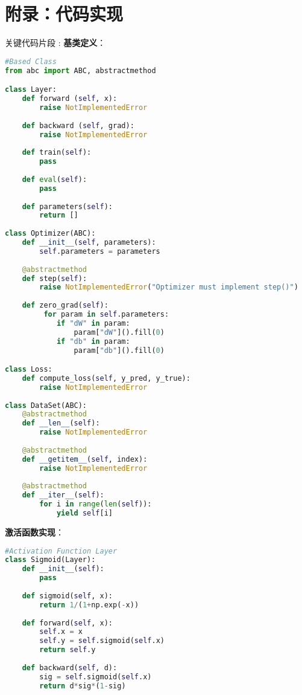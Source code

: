 \documentclass[a4paper, twocolumn]{article}
\begin{document}
\section*{附录：代码实现}
关键代码片段 :
\noindent \textbf{基类定义}：
\begin{lstlisting}[language=Python]
#Based Class
from abc import ABC, abstractmethod

class Layer:
    def forward (self, x):
        raise NotImplementedError
    
    def backward (self, grad):
        raise NotImplementedError
    
    def train(self):
        pass
    
    def eval(self):
        pass
    
    def parameters(self):
        return []
            
class Optimizer(ABC):
    def __init__(self, parameters):
        self.parameters = parameters
    
    @abstractmethod
    def step(self):
        raise NotImplementedError("Optimizer must implement step()")
    
    def zero_grad(self):
         for param in self.parameters:
            if "dW" in param:
                param["dW"]().fill(0)
            if "db" in param:
                param["db"]().fill(0)

class Loss:
    def compute_loss(self, y_pred, y_true): 
        raise NotImplementedError
    
class DataSet(ABC):
    @abstractmethod
    def __len__(self):
        raise NotImplementedError
    
    @abstractmethod
    def __getitem__(self, index):
        raise NotImplementedError
    
    @abstractmethod
    def __iter__(self):
        for i in range(len(self)):
            yield self[i]
\end{lstlisting}

\noindent \textbf{激活函数实现}：
\begin{lstlisting}[language=Python]
#Activation Function Layer
class Sigmoid(Layer):
    def __init__(self):
        pass
    
    def sigmoid(self, x):
        return 1/(1+np.exp(-x))
    
    def forward(self, x):
        self.x = x
        self.y = self.sigmoid(self.x)
        return self.y
    
    def backward(self, d):
        sig = self.sigmoid(self.x)
        return d*sig*(1-sig)
\end{lstlisting}
\end{document}
